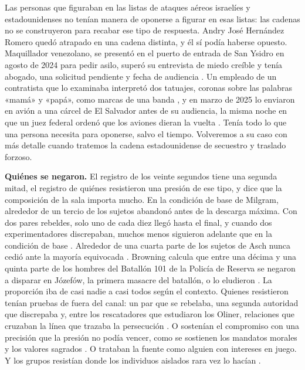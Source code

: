 Las personas que figuraban en las listas de ataques aéreos israelíes y estadounidenses no tenían manera de oponerse a figurar en esas listas: las cadenas no se construyeron para recabar ese tipo de respuesta. Andry José Hernández Romero quedó atrapado en una cadena distinta, y él sí podía haberse opuesto. Maquillador venezolano, se presentó en el puerto de entrada de San Ysidro en agosto de 2024 para pedir asilo, superó su entrevista de miedo creíble y tenía abogado, una solicitud pendiente y fecha de audiencia \autocite{LULAC2025HernandezRomero,Vega2025HernandezRomero}. Un empleado de un contratista que lo examinaba interpretó dos tatuajes, coronas sobre las palabras «mamá» y «papá», como marcas de una banda \autocite{Palomera2025Blade}, y en marzo de 2025 lo enviaron en avión a una cárcel de El Salvador antes de su audiencia, la misma noche en que un juez federal ordenó que los aviones dieran la vuelta \autocite{jgg2025contempt}. Tenía todo lo que una persona necesita para oponerse, salvo el tiempo. Volveremos a su caso con más detalle cuando tratemos la cadena estadounidense de secuestro y traslado forzoso.

\textbf{Quiénes se negaron.} El registro de los veinte segundos tiene una segunda mitad, el registro de quiénes resistieron una presión de ese tipo, y dice que la composición de la sala importa mucho. En la condición de base de Milgram, alrededor de un tercio de los sujetos abandonó antes de la descarga máxima. Con dos pares rebeldes, solo uno de cada diez llegó hasta el final, y cuando dos experimentadores discrepaban, muchos menos siguieron adelante que en la condición de base \autocite{milgram1974obedience}. Alrededor de una cuarta parte de los sujetos de Asch nunca cedió ante la mayoría equivocada \autocite{asch1956studies}. Browning calcula que entre una décima y una quinta parte de los hombres del Batallón 101 de la Policía de Reserva se negaron a disparar en Józefów, la primera masacre del batallón, o lo eludieron \autocite{browning1992ordinary}. La proporción iba de casi nadie a casi todos según el contexto. Quienes resistieron tenían pruebas de fuera del canal: un par que se rebelaba, una segunda autoridad que discrepaba y, entre los rescatadores que estudiaron los Oliner, relaciones que cruzaban la línea que trazaba la persecución \autocite{oliner1988altruistic}. O sostenían el compromiso con una precisión que la presión no podía vencer, como se sostienen los mandatos morales y los valores sagrados \autocite{skitka2009limits,ginges2007sacred}. O trataban la fuente como alguien con intereses en juego. Y los grupos resistían donde los individuos aislados rara vez lo hacían \autocite{gamson1982encounters}.

